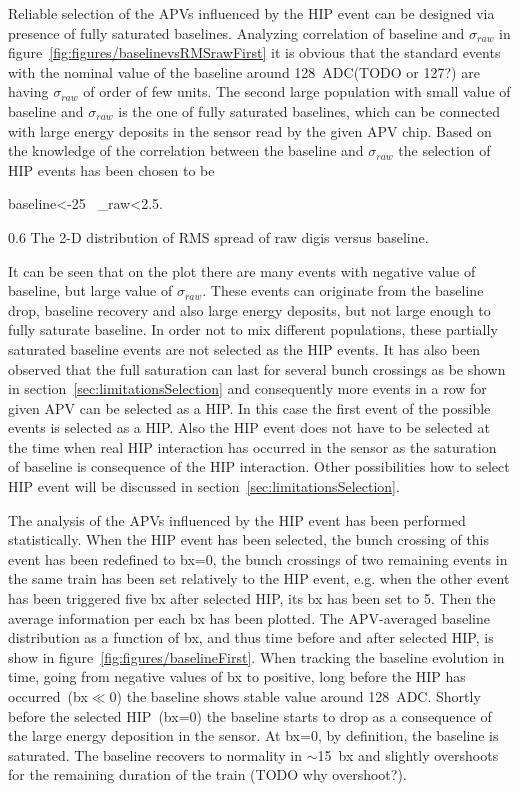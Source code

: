 Reliable selection of the APVs influenced by the HIP event can be designed via presence of fully saturated baselines. Analyzing correlation of baseline and $\sigma_{raw}$ in figure~\ref{fig:figures/baselinevsRMSrawFirst} it is obvious that the standard events with the nominal value of the baseline around 128~ADC(TODO or 127?) are having $\sigma_{raw}$ of order of few units. The second large population with small value of baseline and $\sigma_{raw}$ is the one of fully saturated baselines, which can be connected with large energy deposits in the sensor read by the given APV chip. Based on the knowledge of the correlation between the baseline and $\sigma_{raw}$ the selection of HIP events has been chosen to be 

{
baseline<-25~  \sigma_{raw}<2.5.
}

                 {0.6}       %
                 {The 2-D distribution of RMS spread of raw digis versus baseline. } %

It can be seen that on the plot there are many events with negative value of baseline, but large value of $\sigma_{raw}$. These events can originate from the baseline drop, baseline recovery and also large energy deposits, but not large enough to fully saturate baseline. In order not to mix different populations, these partially saturated baseline events are not selected as the HIP events. It has also been observed that the full saturation can last for several bunch crossings as be shown in section~\ref{sec:limitationsSelection} and consequently more events in a row for given APV can be selected as a HIP. In this case the first event of the possible events is selected as a HIP. Also the HIP event does not have to be selected at the time when real HIP interaction has occurred in the sensor as the saturation of baseline is consequence of the HIP interaction. Other possibilities how to select HIP event will be discussed in section~\ref{sec:limitationsSelection}.

The analysis of the APVs influenced by the HIP event has been performed statistically. When the HIP event has been selected, the bunch crossing of this event has been redefined to bx=0, the bunch crossings of two remaining events in the same train has been set relatively to the HIP event, e.g. when the other event has been triggered five bx after selected HIP, its bx has been set to 5. Then the average information per each bx has been plotted. The APV-averaged baseline distribution as a function of bx, and thus time before and after selected HIP, is show in figure~\ref{fig:figures/baselineFirst}. When tracking the baseline evolution in time, going from negative values of bx to positive, long before the HIP has occurred~(bx$\ll$0) the baseline shows stable value around 128~ADC. Shortly before the selected HIP~(bx=0) the baseline starts to drop as a consequence of the large energy deposition in the sensor. At bx=0, by definition, the baseline is saturated. The baseline recovers to normality in $\sim$15~bx and slightly overshoots for the remaining duration of the train (TODO why overshoot?).

